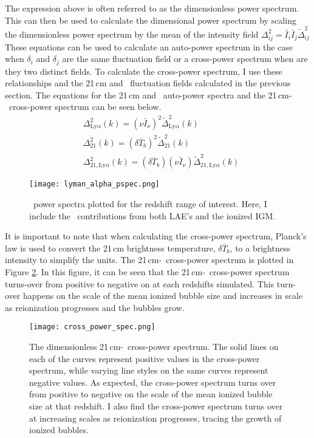 The expression above is often referred to as the dimensionless power spectrum.
This can then be used to calculate the dimensional power spectrum by scaling the
dimensionless power spectrum by the mean of the intensity field $\Delta^2_{ij} = \bar{I}_i \bar{I}_j \widetilde{\Delta}^2_{ij}$
These equations can be used to calculate an auto-power spectrum in the case when
$\delta_i$ and $\delta_j$ are the same fluctuation field or a cross-power spectrum
when are they two distinct fields. To calculate the cross-power spectrum, I use
these relationships and the 21\,cm and \lya\ fluctuation fields calculated in the
previous section. The equations for the 21\,cm and \lya\ auto-power spectra and the
21\,cm-\lya\ cross-power spectrum can be seen below.
\begin{align}
    &\Delta^2_{\textrm{Ly} \alpha} \left( k \right) = \left( \nu \bar{I}_{\nu} \right)^2 \widetilde{\Delta}^2_{\textrm{Ly} \alpha} \left( k \right) \\
    &\Delta^2_{21}\left( k \right) = \left(\delta \overline{T}_b \right)^2 \widetilde{\Delta}^2_{21} \left( k \right) \\
    &\Delta^2_{21, \textrm{Ly} \alpha} \left( k \right) = \left(\delta \overline{T}_b \right) \left( \nu \bar{I}_{\nu} \right) \widetilde{\Delta}^2_{21, \textrm{Ly} \alpha} \left( k \right)
\end{align}

\begin{figure}[ht]
	\centering
	\texttt{[image: lyman\_alpha\_pspec.png]}
	\caption[\lya\ Power Spectrum]{\lya\ power spectra plotted for the redshift range of interest. Here, I include
           the \lya\ contributions from both LAE's and the ionized IGM.}
	\label{fig:lya_ps}
\end{figure}
It is important to note that when calculating the cross-power spectrum, Planck's
law is used to convert the 21\,cm brightness temperature, $\delta \overline{T}_b$,
to a brightness intensity to simplify the units. The 21\,cm-\lya\ cross-power spectrum
is plotted in Figure \ref{fig:x_ps}. In this figure, it can be seen that the 21\,cm-\lya\
cross-power spectrum turns-over from positive to negative on at each redshifts simulated. This turn-over happens
on the scale of the mean ionized bubble size and increases in scale as reionization
progresses and the bubbles grow.

\begin{figure}[ht]
	\centering
	\texttt{[image: cross\_power\_spec.png]}
	\caption[21\,cm-\lya\ Cross-Power Spectrum]{The dimensionless 21\,cm-\lya\ cross-power spectrum. The
           solid lines on each of the curves represent positive values in the cross-power spectrum, while varying line
           styles on the same curves represent negative values. As expected, the cross-power spectrum turns over from
           positive to negative on the scale of the mean ionized bubble size at that redshift. I also find the cross-power
           spectrum turns over at increasing scales as reionization progresses, tracing the growth of ionized bubbles.}
	\label{fig:x_ps}
\end{figure}

